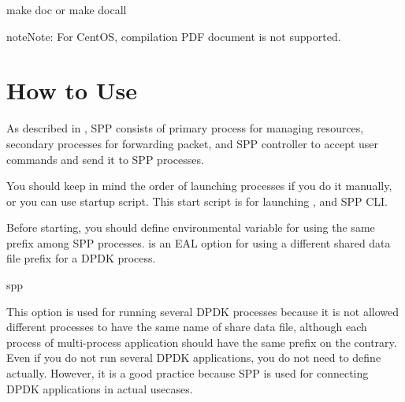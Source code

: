 \documentclass[a4paper,11pt,openany,oneside,english]{sphinxmanual}
\begin{document}
\begin{sphinxVerbatim}[commandchars=\\\{\},formatcom=\footnotesize]
 make doc
 or
 make doc\PYGZhy{}all
\end{sphinxVerbatim}

\begin{sphinxadmonition}{note}{Note:}
For CentOS, compilation PDF document is not supported.
\end{sphinxadmonition}


\section{How to Use}
\label{\detokenize{gsg/howto_use:how-to-use}}\label{\detokenize{gsg/howto_use:spp-gsg-howto-use}}\label{\detokenize{gsg/howto_use::doc}}
As described in {\hyperref[\detokenize{design/spp:spp-overview-design}]{}}, SPP consists of
primary process for managing resources, secondary processes for
forwarding packet, and SPP controller to accept user commands and
send it to SPP processes.

You should keep in mind the order of launching processes if you do it
manually, or you can use startup script. This start script is for launching
,  and SPP CLI.

Before starting, you should define environmental variable 
for using the same prefix among SPP processes.  is an EAL
option for using a different shared data file prefix for a DPDK process.

\begin{sphinxVerbatim}[commandchars=\\\{\},formatcom=\footnotesize]
  spp
\end{sphinxVerbatim}

This option is used for running several DPDK processes because it is not
allowed different processes to have the same name of share data file, although
each process of multi-process application should have the same prefix on the
contrary.
Even if you do not run several DPDK applications, you do not need to define
actually. However, it is a good practice because SPP is used for connecting
DPDK applications in actual usecases.
\end{document}
